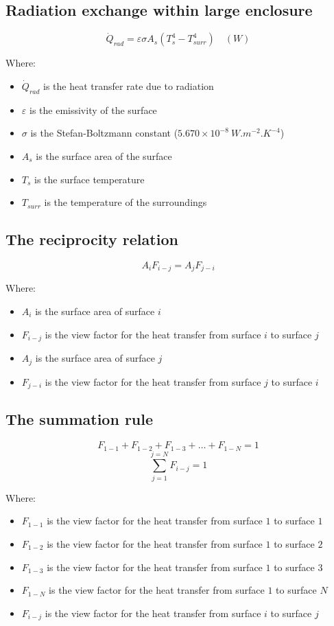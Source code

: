 \documentclass[11pt]{article}
\begin{document}
\subsection{Radiation exchange within large enclosure}
\label{sec:orgc4c7247}
\[\dot{Q}_{rad} = \varepsilon \sigma A_s (T_s^4 - T_{surr}^4) \quad (\unit{W})\]

Where:
\begin{itemize}
\item \(\dot{Q}_{rad}\) is the heat transfer rate due to radiation
\item \(\varepsilon\) is the emissivity of the surface
\item \(\sigma\) is the Stefan-Boltzmann constant (\(5.670 \times 10^{-8} \ \unit{W.m^{-2}.K^{-4}}\))
\item \(A_s\) is the surface area of the surface
\item \(T_s\) is the surface temperature
\item \(T_{surr}\) is the temperature of the surroundings
\end{itemize}
\subsection{The reciprocity relation}
\label{sec:orgc4961f6}
\[A_i F_{i-j} = A_j F_{j-i}\]

Where:
\begin{itemize}
\item \(A_i\) is the surface area of surface \(i\)
\item \(F_{i-j}\) is the view factor for the heat transfer from surface \(i\) to surface \(j\)
\item \(A_j\) is the surface area of surface \(j\)
\item \(F_{j-i}\) is the view factor for the heat transfer from surface \(j\) to surface \(i\)
\end{itemize}
\subsection{The summation rule}
\label{sec:org71b56cb}
\[F_{1-1} + F_{1-2} + F_{1-3} + \ldots + F_{1-N} = 1\]
\[\sum_{j=1}^{j=N} F_{i-j} = 1\]

Where:
\begin{itemize}
\item \(F_{1-1}\) is the view factor for the heat transfer from surface \(1\) to surface \(1\)
\item \(F_{1-2}\) is the view factor for the heat transfer from surface \(1\) to surface \(2\)
\item \(F_{1-3}\) is the view factor for the heat transfer from surface \(1\) to surface \(3\)
\item \(F_{1-N}\) is the view factor for the heat transfer from surface \(1\) to surface \(N\)
\item \(F_{i-j}\) is the view factor for the heat transfer from surface \(i\) to surface \(j\)
\end{itemize}
\end{document}
